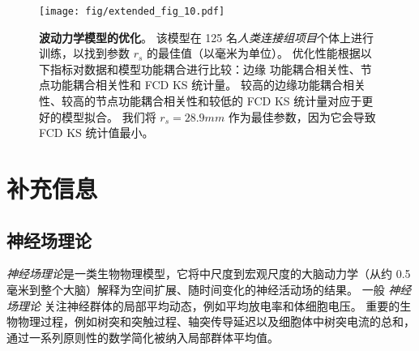 \documentclass[lang=cn,a4paper,newtx,citestyle=gb7714-2015, bibstyle=gb7714-2015]{elegantpaper}
\begin{document}
\begin{figure}[!htb] 
	\centering
	\texttt{[image: fig/extended\_fig\_10.pdf]}
	\caption{\textbf{波动力学模型的优化}。
	该模型在 125 名\textit{人类连接组项目}个体上进行训练，以找到参数 $ r_s $ 的最佳值（以毫米为单位）。
	优化性能根据以下指标对数据和模型功能耦合进行比较：边缘 功能耦合相关性、节点功能耦合相关性和 FCD KS 统计量。
	较高的边缘功能耦合相关性、较高的节点功能耦合相关性和较低的 FCD KS 统计量对应于更好的模型拟合。
	我们将 $ r_s = 28.9 mm $ 作为最佳参数，因为它会导致 FCD KS 统计值最小。}
	\label{fig:extended_fig_10}
\end{figure}



\section{补充信息}

\subsection{神经场理论} \label{sec:NFT}

\textit{神经场理论}是一类生物物理模型，它将中尺度到宏观尺度的大脑动力学（从约 0.5 毫米到整个大脑）解释为空间扩展、随时间变化的神经活动场的结果\cite{beurle1956properties,da1976models,wright1995simulation,deco2008dynamic,jirsa1996field,robinson1997propagation,robinson2005multiscale}。
一般 \textit{神经场理论} 关注神经群体的局部平均动态，例如平均放电率和体细胞电压。
重要的生物物理过程，例如树突和突触过程、轴突传导延迟以及细胞体中树突电流的总和，通过一系列原则性的数学简化被纳入局部群体平均值。
\end{document}
